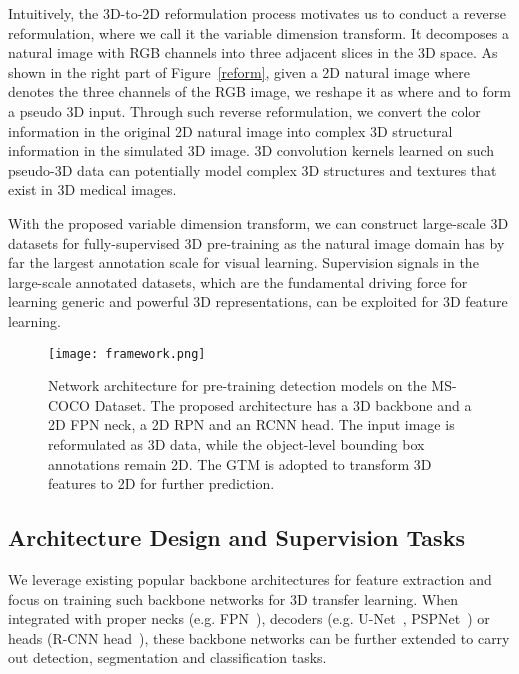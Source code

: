 \documentclass[journal,twoside,web]{ieeecolor}
\begin{document}
Intuitively, the 3D-to-2D reformulation process motivates us to conduct a reverse reformulation, where we call it the variable dimension transform. It decomposes a natural image with RGB channels into three adjacent slices in the 3D space. As shown in the right part of Figure~\ref{reform}, given a 2D natural image  where  denotes the three channels of the RGB image, we reshape it as  where  and  to form a pseudo 3D input. 
Through such reverse reformulation, we convert the color information in the original 2D natural image into complex 3D structural information in the simulated 3D image. 3D convolution kernels learned on such pseudo-3D data can potentially model complex 3D structures and textures that exist in 3D medical images.

With the proposed variable dimension transform, we can construct large-scale 3D datasets for fully-supervised 3D pre-training as the natural image domain has by far the largest annotation scale for visual learning. 
Supervision signals in the large-scale annotated datasets, which are the fundamental driving force for learning generic and powerful 3D representations, can be exploited for 3D feature learning.


\begin{figure}\centering
 	\texttt{[image: framework.png]}
\caption{Network architecture for pre-training detection models on the MS-COCO Dataset. The proposed architecture has a 3D backbone and a 2D FPN neck, a 2D RPN and an RCNN head. The input image is reformulated as 3D data, while the object-level bounding box annotations remain 2D. The GTM is adopted to transform 3D features to 2D for further prediction. }
	\label{arch}
\end{figure}




\subsection{Architecture Design and Supervision Tasks}


We leverage existing popular backbone architectures for feature extraction and focus on training such backbone networks for 3D transfer learning. When integrated with proper necks (e.g. FPN~\cite{lin2017feature}), decoders (e.g. U-Net~\cite{falk2019u}, PSPNet~\cite{zhao2017pyramid}) or heads (R-CNN head~\cite{ren2016faster}), these backbone networks can be further extended to carry out detection, segmentation and classification tasks.
\end{document}
